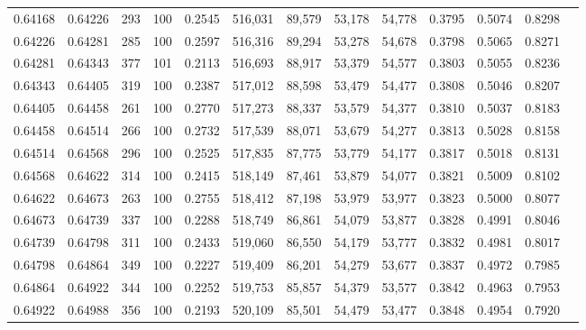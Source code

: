 \begin{tabular}{rrrrrrrrrrrrr}
0.64168 & 0.64226 &   293 & 100 &                                     0.2545 & 516,031 &  89,579 &  53,178 &  54,778 & 0.3795 & 0.5074 & 0.8298 \\
0.64226 & 0.64281 &   285 & 100 &                                     0.2597 & 516,316 &  89,294 &  53,278 &  54,678 & 0.3798 & 0.5065 & 0.8271 \\
0.64281 & 0.64343 &   377 & 101 &                                     0.2113 & 516,693 &  88,917 &  53,379 &  54,577 & 0.3803 & 0.5055 & 0.8236 \\
0.64343 & 0.64405 &   319 & 100 &                                     0.2387 & 517,012 &  88,598 &  53,479 &  54,477 & 0.3808 & 0.5046 & 0.8207 \\
0.64405 & 0.64458 &   261 & 100 &                                     0.2770 & 517,273 &  88,337 &  53,579 &  54,377 & 0.3810 & 0.5037 & 0.8183 \\
0.64458 & 0.64514 &   266 & 100 &                                     0.2732 & 517,539 &  88,071 &  53,679 &  54,277 & 0.3813 & 0.5028 & 0.8158 \\
0.64514 & 0.64568 &   296 & 100 &                                     0.2525 & 517,835 &  87,775 &  53,779 &  54,177 & 0.3817 & 0.5018 & 0.8131 \\
0.64568 & 0.64622 &   314 & 100 &                                     0.2415 & 518,149 &  87,461 &  53,879 &  54,077 & 0.3821 & 0.5009 & 0.8102 \\
0.64622 & 0.64673 &   263 & 100 &                                     0.2755 & 518,412 &  87,198 &  53,979 &  53,977 & 0.3823 & 0.5000 & 0.8077 \\
0.64673 & 0.64739 &   337 & 100 &                                     0.2288 & 518,749 &  86,861 &  54,079 &  53,877 & 0.3828 & 0.4991 & 0.8046 \\
0.64739 & 0.64798 &   311 & 100 &                                     0.2433 & 519,060 &  86,550 &  54,179 &  53,777 & 0.3832 & 0.4981 & 0.8017 \\
0.64798 & 0.64864 &   349 & 100 &                                     0.2227 & 519,409 &  86,201 &  54,279 &  53,677 & 0.3837 & 0.4972 & 0.7985 \\
0.64864 & 0.64922 &   344 & 100 &                                     0.2252 & 519,753 &  85,857 &  54,379 &  53,577 & 0.3842 & 0.4963 & 0.7953 \\
0.64922 & 0.64988 &   356 & 100 &                                     0.2193 & 520,109 &  85,501 &  54,479 &  53,477 & 0.3848 & 0.4954 & 0.7920 \\

\end{tabular}
